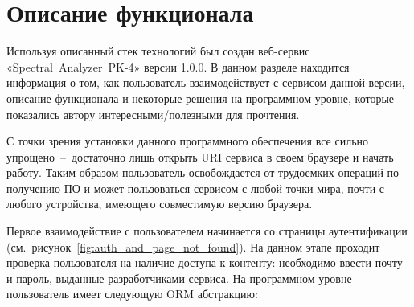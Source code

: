 \section{Описание функционала}
Используя описанный стек технологий был создан веб-сервис «Spectral~Analyzer~PK-4» версии 1.0.0.
В данном разделе находится информация о том, как пользователь взаимодействует с сервисом данной версии, описание функционала
и некоторые решения на программном уровне, которые показались автору интересными/полезными для прочтения.

С точки зрения установки данного программного обеспечения все сильно упрощено~--~достаточно лишь открыть URI
сервиса в своем браузере и начать работу. Таким образом пользователь освобождается от трудоемких операций по получению ПО
и может пользоваться сервисом с любой точки мира, почти с любого устройства, имеющего совместимую версию браузера.

Первое взаимодействие с пользователем начинается со страницы аутентификации (см.~рисунок~\ref{fig:auth_and_page_not_found}). На данном
этапе проходит проверка пользователя на наличие доступа к контенту: необходимо ввести почту и пароль, выданные разработчиками
сервиса. На программном уровне пользователь имеет следующую ORM абстракцию:


